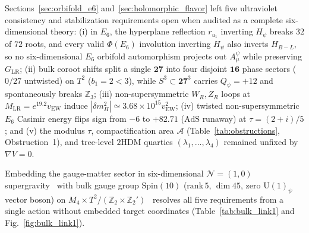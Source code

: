 \documentclass[aps,prd,twocolumn,nofootinbib,floatfix]{revtex4-2}
\begin{document}
Sections~\ref{sec:orbifold_e6} and~\ref{sec:holomorphic_flavor} left five ultraviolet consistency and stabilization requirements open when audited as a complete six-dimensional theory: (i) in $E_6$, the hyperplane reflection $r_{u_1}$ inverting $H_\psi$ breaks $32$ of $72$ roots, and every valid $\Phi(E_6)$ involution inverting $H_\psi$ also inverts $H_{B-L}$, so no six-dimensional $E_6$ orbifold automorphism projects out $A_\mu^\psi$ while preserving $G_{\mathrm{LR}}$; (ii) bulk coroot shifts split a single $\mathbf{27}$ into four disjoint $\mathbf{16}$ phase sectors ($0/27$ untwisted) on $T^2$ ($b_1 = 2 < 3$), while $S^3 \subset \mathbf{27}^3$ carries $Q_\psi = +12$ and spontaneously breaks $\mathbb{Z}_3$; (iii) non-supersymmetric $W_R, Z_R$ loops at $M_{\mathrm{LR}} = e^{19.2}v_{\mathrm{EW}}$ induce $|\delta m_H^2| \simeq 3.68\times 10^{15}v_{\mathrm{EW}}^2$; (iv) twisted non-supersymmetric $E_6$ Casimir energy flips sign from $-6$ to $+82.71$ ($\mathrm{AdS}$ runaway) at $\tau = (2+i)/5$; and (v) the modulus $\tau$, compactification area $\mathcal{A}$ (Table~\ref{tab:obstructions}, Obstruction~1), and tree-level $2\mathrm{HDM}$ quartics $(\lambda_1,\dots,\lambda_4)$ remained unfixed by $\nabla V = 0$.

Embedding the gauge-matter sector in six-dimensional $\mathcal{N}=(1,0)$ supergravity~\cite{SalamSezgin1984,Sagnotti1992} with bulk gauge group $\mathrm{Spin}(10)$ ($\mathrm{rank}\,5$, $\dim 45$, zero $\mathrm{U}(1)_\psi$ vector boson) on $M_4 \times T^2/(\mathbb{Z}_2\times\mathbb{Z}_2')$~\cite{AsakaBuchmullerCovi2001} resolves all five requirements from a single action without embedded target coordinates (Table~\ref{tab:bulk_link1} and Fig.~\ref{fig:bulk_link1}).
\end{document}
